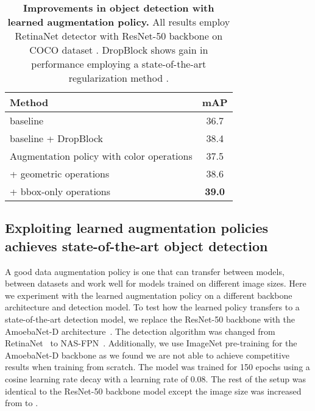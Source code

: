 \documentclass[10pt,twocolumn,letterpaper]{article}
\begin{document}
\begin{table}[t]
\centering
\begin{tabular}{l|c}
\hline
  Method & mAP  \\
  \hline
  baseline & 36.7 \\
  \hline
  baseline + DropBlock~\cite{ghiasi2018dropblock} & 38.4 \\
  \hline 
  Augmentation policy with color operations &  37.5\\
  + geometric operations & 38.6 \\
  + bbox-only operations & \textbf{39.0} \\
  \hline
\end{tabular}
\caption{\textbf{Improvements in object detection with learned augmentation policy.} All results employ RetinaNet detector with ResNet-50 backbone \cite{lin2017focal} on COCO dataset \cite{lin2014microsoft}. DropBlock shows gain in performance employing a state-of-the-art regularization method \cite{ghiasi2018dropblock}.}
\label{tab:search_space}  
\end{table}



\subsection{Exploiting learned augmentation policies achieves state-of-the-art object detection}
A good data augmentation policy is one that can transfer between models, between datasets and work well for models trained on different image sizes. Here we experiment with the learned augmentation policy
on a different backbone architecture and detection model.
To test how the learned policy transfers to a state-of-the-art detection model, we replace the ResNet-50 backbone with the AmoebaNet-D architecture~\cite{real2018regularized}. The detection algorithm was changed from RetinaNet~\cite{lin2017focal} to NAS-FPN~\cite{ghiasi2019NASFpn}. Additionally, we use ImageNet pre-training for the AmoebaNet-D backbone as we found we are not able to achieve competitive results when training from scratch. The model was trained for 150 epochs using a cosine learning rate decay with a learning rate of 0.08. The rest of the setup was identical to the ResNet-50 backbone model except the image size was increased from  to . 
\end{document}

